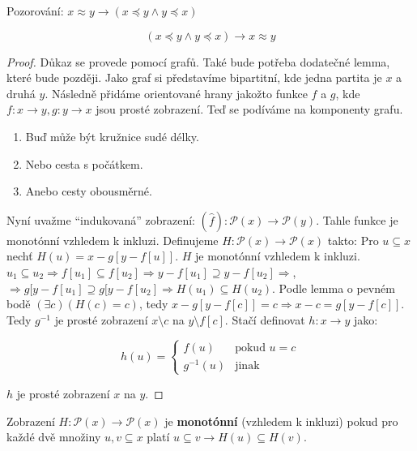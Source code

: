 Pozorování: $x \approx y \rightarrow (x \preceq y \land y \preceq x)$

\begin{thm}
	$$
	(x \preceq y \land y \preceq x) \rightarrow x \approx y
	$$
\end{thm}

\begin{proof}
	Důkaz se provede pomocí grafů. Také bude potřeba dodatečné lemma, které bude později. Jako graf si představíme bipartitní, kde jedna partita je $x$ a druhá $y$. Následně přidáme orientované hrany jakožto funkce $f$ a $g$, kde $f: x \to y, g: y \to x$ jsou prosté zobrazení. Teď se podíváme na komponenty grafu.
	
	\begin{enumerate}
		\item Buď může být kružnice sudé délky.
		\item Nebo cesta s počátkem.
		\item Anebo cesty obousměrné.
	\end{enumerate}
	
	Nyní uvažme “indukovaná” zobrazení: $(\hat{f}): \mathcal{P}(x) \to \mathcal{P}(y)$. Tahle funkce je monotónní vzhledem k inkluzi. Definujeme $H: \mathcal{P}(x) \to \mathcal{P}(x)$ takto: Pro $u \subseteq x$ nechť $H(u) = x - g[y - f[u]]$. $H$ je monotónní vzhledem k inkluzi. $u_{1} \subseteq u_{2} \Rightarrow f[u_{1}] \subseteq f[u_{2}] \Rightarrow y - f[u_{1}] \supseteq y - f[u_{2}] \Rightarrow$, $\Rightarrow g[y - f[u_{1}] \supseteq g[y - f[u_{2}] \Rightarrow H(u_{1}) \subseteq H(u_{2})$. Podle lemma o pevném bodě $(\exists c)(H(c) = c)$, tedy $x - g[y - f[c]] = c \Rightarrow x - c = g[y - f[c]]$. Tedy $g^{-1}$ je prosté zobrazení $x\setminus c$ na $y \setminus f[c]$. Stačí definovat $h: x \to y$ jako:
	
	$$
	h(u) =
	\left\{
	\begin{array}{ll}
		f(u) & \text{pokud } u = c \\
		g^{-1}(u) & \text{jinak}
	\end{array}
	\right.
	$$
	
	$h$ je prosté zobrazení $x$ na $y$.
\end{proof}

\begin{definice}
	Zobrazení $H: \mathcal{P}(x) \to \mathcal{P}(x)$ je \textbf{monotónní} (vzhledem k inkluzi) pokud pro každé dvě množiny $u,v \subseteq x$ platí $u \subseteq v \rightarrow H(u) \subseteq H(v)$.
\end{definice}

